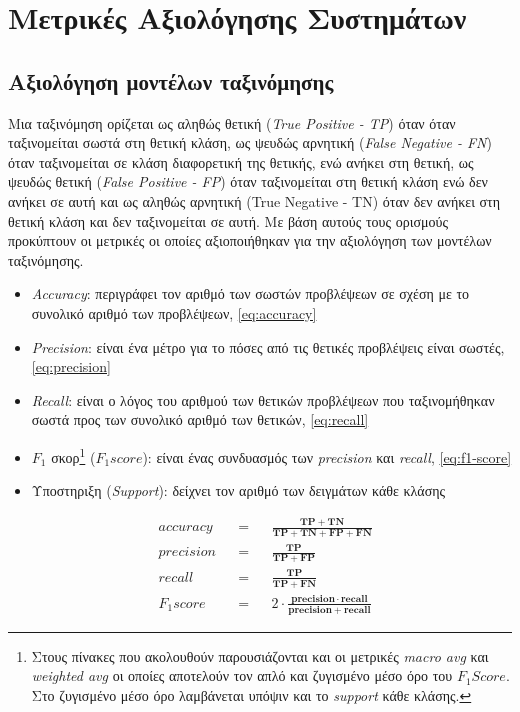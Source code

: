 \section{Μετρικές Αξιολόγησης Συστημάτων}
\label{sec:metrics}
\subsection{Αξιολόγηση μοντέλων ταξινόμησης}
Μια ταξινόμηση ορίζεται ως αληθώς θετική (\emph{True Positive - TP}) όταν όταν ταξινομείται σωστά στη θετική κλάση, ως ψευδώς αρνητική (\emph{False Negative - FN}) όταν ταξινομείται σε κλάση διαφορετική της θετικής, ενώ ανήκει στη θετική, ως ψευδώς θετική (\emph{False Positive - FP}) όταν ταξινομείται στη θετική κλάση ενώ δεν ανήκει σε αυτή και ως αληθώς αρνητική (True Negative - TN) όταν δεν ανήκει στη θετική κλάση και δεν ταξινομείται σε αυτή. Με βάση αυτούς τους ορισμούς προκύπτουν οι μετρικές οι οποίες αξιοποιήθηκαν για την αξιολόγηση των μοντέλων ταξινόμησης.

\begin{itemize}
    \item \emph{Accuracy}: περιγράφει τον αριθμό των σωστών προβλέψεων σε σχέση με το συνολικό αριθμό των προβλέψεων, \autoref{eq:accuracy}
    \item \emph{Precision}: είναι ένα μέτρο για το πόσες από τις θετικές προβλέψεις είναι σωστές, \autoref{eq:precision}
    \item \emph{Recall}: είναι ο λόγος του αριθμού των θετικών προβλέψεων που ταξινομήθηκαν σωστά προς των συνολικό αριθμό των θετικών, \autoref{eq:recall}
    \item $F_1$ σκορ\footnote{Στους πίνακες που ακολουθούν παρουσιάζονται και οι μετρικές \emph{macro avg} και \emph{weighted avg} οι οποίες αποτελούν τον απλό και ζυγισμένο μέσο όρο του $F_1 Score$. Στο ζυγισμένο μέσο όρο λαμβάνεται υπόψιν και το \emph{support} κάθε κλάσης.} ($F_1 score$): είναι ένας συνδυασμός των \emph{precision} και \emph{recall}, \autoref{eq:f1-score}
    \item Υποστηριξη (\emph{Support}): δείχνει τον αριθμό των δειγμάτων κάθε κλάσης
\end{itemize}

\begin{align}
    &accuracy& &=& &\frac{\mathbf{TP} + \mathbf{TN}}{\mathbf{TP} + \mathbf{TN} + \mathbf{FP} + \mathbf{FN}} \label{eq:accuracy}\\
    &precision& &=& &\frac{\mathbf{TP}}{\mathbf{TP} + \mathbf{FP}}
    \label{eq:precision}\\
    &recall& &=& &\frac{\mathbf{TP}}{\mathbf{TP} + \mathbf{FN}}
    \label{eq:recall}\\
    &F_1 score& &=& &2 \cdot \frac{\mathbf{precision} \cdot \mathbf{recall}}{\mathbf{precision}+\mathbf{recall}}
    \label{eq:f1-score}
\end{align}

